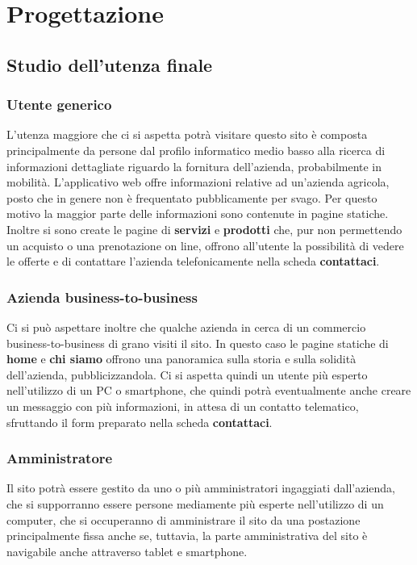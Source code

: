 \newpage
\section{Progettazione}
\subsection{Studio dell'utenza finale}
\subsubsection{Utente generico}
L'utenza maggiore che ci si aspetta potrà visitare questo sito è composta principalmente da persone dal profilo informatico medio basso alla ricerca di informazioni dettagliate riguardo la fornitura dell'azienda, probabilmente in mobilità. L'applicativo web offre informazioni relative ad un'azienda agricola, posto che in genere non è frequentato pubblicamente per svago. Per questo motivo la maggior parte delle informazioni sono contenute in pagine statiche. Inoltre si sono create le pagine di \textbf{servizi} e \textbf{prodotti} che, pur non permettendo un acquisto o una prenotazione on line, offrono all'utente la possibilità di vedere le offerte e di contattare l'azienda telefonicamente nella scheda \textbf{contattaci}.
\subsubsection{Azienda business-to-business}
Ci si può aspettare inoltre che qualche azienda in cerca di un commercio business-to-business di grano visiti il sito. In questo caso le pagine statiche di \textbf{home} e \textbf{chi siamo} offrono una panoramica sulla storia e sulla solidità dell'azienda, pubblicizzandola. Ci si aspetta quindi un utente più esperto nell'utilizzo di un PC o smartphone, che quindi potrà eventualmente anche creare un messaggio con più informazioni, in attesa di un contatto telematico, sfruttando il form preparato nella scheda \textbf{contattaci}.
\subsubsection{Amministratore}
Il sito potrà essere gestito da uno o più amministratori ingaggiati dall'azienda, che si supporranno essere persone mediamente più esperte nell'utilizzo di un computer, che si occuperanno di amministrare il sito da una postazione principalmente fissa anche se, tuttavia, la parte amministrativa del sito è navigabile anche attraverso tablet e smartphone.


